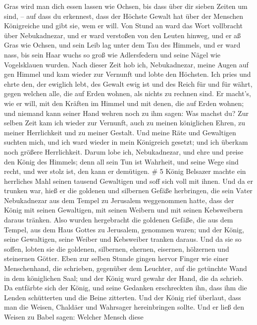 Gras wird man dich essen lassen wie Ochsen, bis dass über dir sieben
Zeiten um sind, -- auf dass du erkennest, dass der Höchste Gewalt hat
über der Menschen Königreiche und gibt sie, wem er will. 
Von Stund an ward das Wort vollbracht über Nebukadnezar, und er ward
verstoßen von den Leuten hinweg, und er aß Gras wie Ochsen, und sein
Leib lag unter dem Tau des Himmels, und er ward nass, bis sein Haar
wuchs so groß wie Adlersfedern und seine Nägel wie Vogelsklauen wurden.
 Nach dieser Zeit hob ich, Nebukadnezar, meine Augen auf
gen Himmel und kam wieder zur Vernunft und lobte den Höchsten. Ich pries
und ehrte den, der ewiglich lebt, des Gewalt ewig ist und des Reich für
und für währt,  gegen welchen alle, die auf Erden wohnen,
als nichts zu rechnen sind. Er macht's, wie er will, mit den Kräften im
Himmel und mit denen, die auf Erden wohnen; und niemand kann seiner Hand
wehren noch zu ihm sagen: Was machst du?  Zur selben Zeit
kam ich wieder zur Vernunft, auch zu meinen königlichen Ehren, zu meiner
Herrlichkeit und zu meiner Gestalt. Und meine Räte und Gewaltigen
suchten mich, und ich ward wieder in mein Königreich gesetzt; und ich
überkam noch größere Herrlichkeit.  Darum lobe ich,
Nebukadnezar, und ehre und preise den König des Himmels; denn all sein
Tun ist Wahrheit, und seine Wege sind recht, und wer stolz ist, den kann
er demütigen. \# 5  König Belsazer machte ein herrliches
Mahl seinen tausend Gewaltigen und soff sich voll mit ihnen.
 Und da er trunken war, hieß er die goldenen und silbernen
Gefäße herbringen, die sein Vater Nebukadnezar aus dem Tempel zu
Jerusalem weggenommen hatte, dass der König mit seinen Gewaltigen, mit
seinen Weibern und mit seinen Kebsweibern daraus tränken. 
Also wurden hergebracht die goldenen Gefäße, die aus dem Tempel, aus dem
Haus Gottes zu Jerusalem, genommen waren; und der König, seine
Gewaltigen, seine Weiber und Kebsweiber tranken daraus.  Und
da sie so soffen, lobten sie die goldenen, silbernen, ehernen, eisernen,
hölzernen und steinernen Götter.  Eben zur selben Stunde
gingen hervor Finger wie einer Menschenhand, die schrieben, gegenüber
dem Leuchter, auf die getünchte Wand in dem königlichen Saal; und der
König ward gewahr der Hand, die da schrieb.  Da entfärbte
sich der König, und seine Gedanken erschreckten ihn, dass ihm die Lenden
schütterten und die Beine zitterten.  Und der König rief
überlaut, dass man die Weisen, Chaldäer und Wahrsager hereinbringen
sollte. Und er ließ den Weisen zu Babel sagen: Welcher Mensch diese
